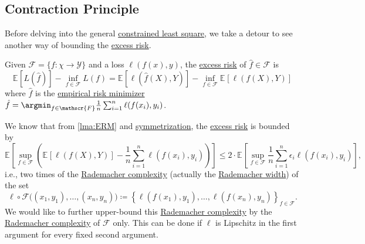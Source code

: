 \subsection{Contraction Principle}
Before delving into the general \hyperref[prb:constrained-LS]{constrained least square}, we take a detour to see another way of bounding the \hyperref[def:excess-risk]{excess risk}.

\begin{prev}
	Given \(\mathscr{F} = \{ f\colon \chi \to \mathscr{Y} \} \) and a loss \(\ell (f(x), y)\), the \hyperref[def:excess-risk]{excess risk} of \(\hat{f} \in \mathscr{F} \) is
	\[
		\mathbb{E}_{}[L(\hat{f} ) ] - \inf _{f\in \mathscr{F} } L(f)
		= \mathbb{E}_{}[\ell (\hat{f} (X), Y) ] - \inf _{f\in \mathscr{F} } \mathbb{E}_{}\left[\ell (f(X), Y) \right]
	\]
	where \(\hat{f} \) is the \hyperref[prb:ERM]{empirical risk minimizer} \(\hat{f} = \argmin_{f\in \mathscr{F} } \frac{1}{n} \sum_{i=1}^{n} \ell (f(x_i), y_i)\).
\end{prev}

We know that from \autoref{lma:ERM} and \hyperref[lma:symmetrization]{symmetrization}, the \hyperref[def:excess-risk]{excess risk} is bounded by
\[
	\mathbb{E}_{}\left[\sup _{f\in \mathscr{F} } \left( \mathbb{E}_{}\left[\ell (f(X), Y) \right] - \frac{1}{n} \sum_{i=1}^{n} \ell (f(x_i), y_i) \right) \right]
	\leq 2 \cdot \mathbb{E}_{}\left[\sup _{f\in \mathscr{F} } \frac{1}{n} \sum_{i=1}^{n} \epsilon _i \ell (f(x_i), y_i) \right] ,
\]
i.e., two times of the \hyperref[def:Rademacher-complexity]{Rademacher complexity} (actually the \hyperref[def:Rademacher-width]{Rademacher width}) of the set
\[
	\ell \circ \mathscr{F} \big( (x_1, y_1), \dots , (x_n, y_n) \big)
	\coloneqq \left\{ \ell (f(x_1), y_1), \dots , \ell (f(x_n), y_n) \right\} _{f\in \mathscr{F} }.
\]
We would like to further upper-bound this \hyperref[def:Rademacher-complexity]{Rademacher complexity} by the \hyperref[def:Rademacher-complexity]{Rademacher complexity} of \(\mathscr{F} \) only. This can be done if \(\ell \) is Lipschitz in the first argument for every fixed second argument.

